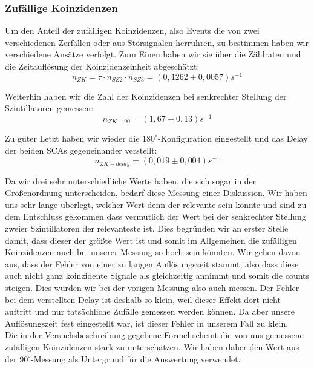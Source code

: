 \subsubsection{Zufällige Koinzidenzen}

Um den Anteil der zufälligen Koinzidenzen, also Events die von zwei verschiedenen Zerfällen oder aus Störsignalen herrühren, zu bestimmen haben wir verschiedene Ansätze verfolgt. Zum Einen haben wir sie über die Zählraten und die Zeitauflösung der Koinzidenzeinheit abgeschätzt:
\begin{equation*}
 n_{ZK} = \tau \cdot n_{SZ2} \cdot n_{SZ3} = (0,1262 \pm 0,0057) s^{-1}
\end{equation*}

Weiterhin haben wir die Zahl der Koinzidenzen bei senkrechter Stellung der Szintillatoren gemessen:
\begin{equation*}
 n_{ZK-90} = (1,67  \pm  0,13) s^{-1}
\end{equation*}

Zu guter Letzt haben wir wieder die $180^\circ$-Konfiguration eingestellt und das Delay der beiden SCAs gegeneinander verstellt: 
\begin{equation*}
 n_{ZK-delay} = (0,019  \pm  0,004) s^{-1}
\end{equation*}

Da wir drei sehr unterschiedliche Werte haben, die sich sogar in der Größenordnung unterscheiden, bedarf diese Messung einer Diskussion. Wir haben uns sehr lange überlegt, welcher Wert denn der relevante sein könnte und sind zu dem Entschluss gekommen dass vermutlich der Wert bei der senkrechter Stellung zweier Szintillatoren der relevanteste ist. Dies begründen wir an erster Stelle damit, dass dieser der größte Wert ist und somit im Allgemeinen die zufälligen Koinzidenzen auch bei unserer Messung so hoch sein könnten. Wir gehen davon aus, dass der Fehler von einer zu langen Auflösungszeit stammt, also dass diese auch nicht ganz koinzidente Signale als gleichzeitig annimmt und somit die counts steigen. Dies würden wir bei der vorigen Messung also auch messen. Der Fehler bei dem verstellten Delay ist deshalb so klein, weil dieser Effekt dort nicht auftritt und nur tatsächliche Zufälle gemessen werden können. Da aber unsere Auflösungszeit fest eingestellt war, ist dieser Fehler in unserem Fall zu klein. \\

Die in der Versuchsbeschreibung gegebene Formel scheint die von uns gemessene zufälligen Koinzidenzen stark zu unterschätzen. Wir haben daher den Wert aus der $90^\circ$-Messung als Untergrund für die Auswertung verwendet.
 
